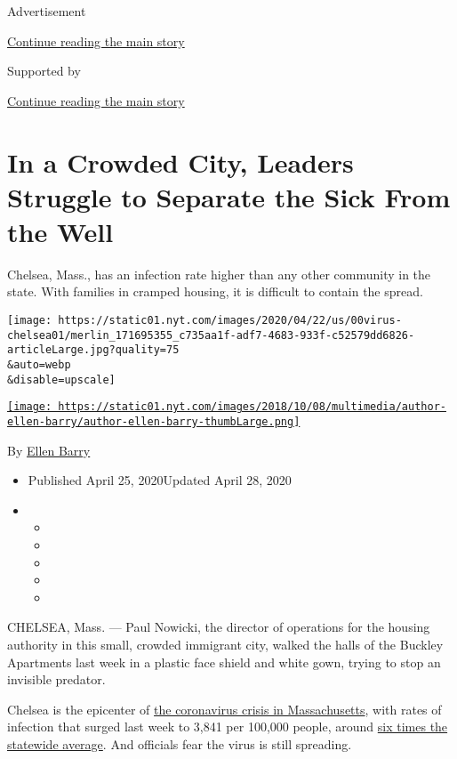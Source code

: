 Advertisement

\protect\hyperlink{after-top}{Continue reading the main story}

Supported by

\protect\hyperlink{after-sponsor}{Continue reading the main story}

\hypertarget{in-a-crowded-city-leaders-struggle-to-separate-the-sick-from-the-well}{%
\section{In a Crowded City, Leaders Struggle to Separate the Sick From
the
Well}\label{in-a-crowded-city-leaders-struggle-to-separate-the-sick-from-the-well}}

Chelsea, Mass., has an infection rate higher than any other community in
the state. With families in cramped housing, it is difficult to contain
the spread.

\texttt{[image: https://static01.nyt.com/images/2020/04/22/us/00virus-chelsea01/merlin\_171695355\_c735aa1f-adf7-4683-933f-c52579dd6826-articleLarge.jpg?quality=75\\\&auto=webp\\\&disable=upscale]}

\href{https://www.nytimes.com/by/ellen-barry}{\texttt{[image: https://static01.nyt.com/images/2018/10/08/multimedia/author-ellen-barry/author-ellen-barry-thumbLarge.png]}}

By \href{https://www.nytimes.com/by/ellen-barry}{Ellen Barry}

\begin{itemize}
\item
  Published April 25, 2020Updated April 28, 2020
\item
  \begin{itemize}
  \item
  \item
  \item
  \item
  \item
  \end{itemize}
\end{itemize}

CHELSEA, Mass. --- Paul Nowicki, the director of operations for the
housing authority in this small, crowded immigrant city, walked the
halls of the Buckley Apartments last week in a plastic face shield and
white gown, trying to stop an invisible predator.

Chelsea is the epicenter of
\href{https://www.nytimes.com/interactive/2020/us/massachusetts-coronavirus-cases.html}{the
coronavirus crisis in Massachusetts}, with rates of infection that
surged last week to 3,841 per 100,000 people, around
\href{https://www.mass.gov/doc/confirmed-covid-19-cases-in-ma-by-citytown-january-1-2020-april-22-2020-pdf/download}{six
times the statewide average}. And officials fear the virus is still
spreading.

